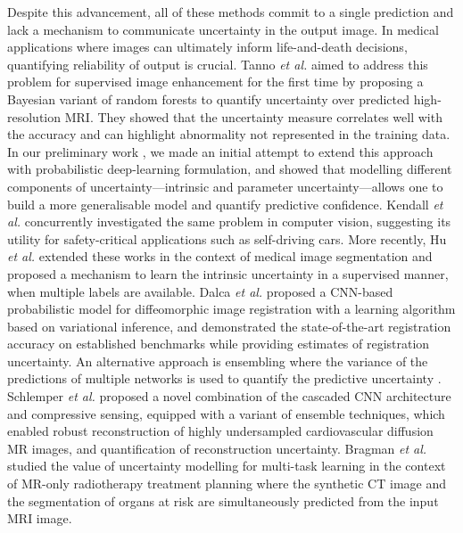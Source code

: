 Despite this advancement, all of these methods commit to a single prediction and lack a mechanism to communicate uncertainty in the output image.  In medical applications where images can ultimately inform life-and-death decisions, quantifying reliability of output is crucial. Tanno \emph{et al.} \cite{tanno2016bayesian} aimed to address this problem for supervised image enhancement for the first time by proposing a Bayesian variant of random forests to quantify uncertainty over predicted high-resolution MRI. They showed that the uncertainty measure correlates well with the accuracy and can highlight abnormality not represented in the training data. In our preliminary work \cite{tanno2017bayesian}, we made an initial attempt
to extend this approach with probabilistic deep-learning formulation, and showed that modelling different components of uncertainty---intrinsic and parameter uncertainty---allows one to build a more generalisable model and quantify predictive confidence. Kendall \emph{et al.} \cite{kendall2017uncertainties} concurrently investigated the same problem in computer vision, suggesting its utility for safety-critical applications such as self-driving cars. More recently, Hu \emph{et al.}\cite{hu2019uncertainty} extended these works in the context of medical image segmentation and proposed a mechanism to learn the intrinsic uncertainty in a supervised manner, when multiple labels are available. Dalca \emph{et al.} \cite{dalca2018unsupervised} proposed a CNN-based probabilistic model for diffeomorphic image registration with a learning algorithm based on variational inference, and demonstrated the state-of-the-art registration accuracy on established benchmarks while providing estimates of registration uncertainty. An alternative approach is ensembling where the variance of the predictions of multiple networks is used to quantify the predictive uncertainty \cite{lakshminarayanan2017simple}. Schlemper \emph{et al.} \cite{schlemper2018stochastic} proposed a novel combination of the cascaded CNN architecture and compressive sensing, equipped with a variant of ensemble techniques, which enabled robust reconstruction of highly undersampled cardiovascular diffusion MR images, and quantification of reconstruction uncertainty. Bragman \emph{et al.} \cite{bragman2018uncertainty} studied the value of uncertainty modelling for multi-task learning in the context of MR-only radiotherapy treatment planning where the synthetic CT image and the segmentation of organs at risk are simultaneously predicted from the input MRI image.  

